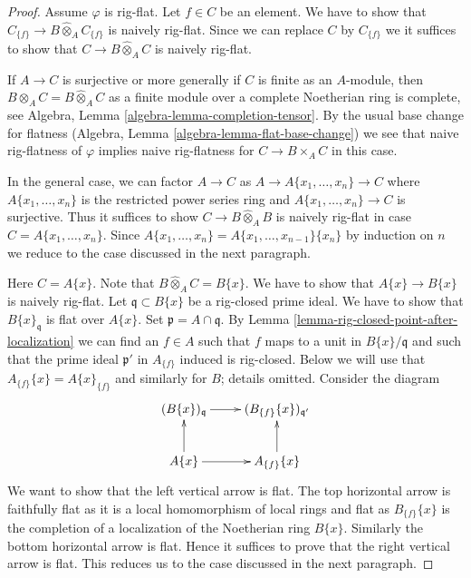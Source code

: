 \documentclass{stacks-project}
\theoremstyle{plain}
\theoremstyle{definition}
\theoremstyle{remark}
\numberwithin{equation}{subsection}
\begin{document}
\begin{proof}
Assume $\varphi$ is rig-flat. Let $f \in C$ be an element.
We have to show that
$C_{\{f\}} \to B \widehat{\otimes}_A C_{\{f\}}$
is naively rig-flat. Since we can replace $C$ by $C_{\{f\}}$
we it suffices to show that $C \to B \widehat{\otimes}_A C$
is naively rig-flat.

\medskip\noindent
If $A \to C$ is surjective or more generally if $C$ is finite as
an $A$-module, then $B \otimes_A C = B \widehat{\otimes}_A C$
as a finite module over a complete Noetherian ring is complete, see
Algebra, Lemma \ref{algebra-lemma-completion-tensor}.
By the usual base change for flatness
(Algebra, Lemma \ref{algebra-lemma-flat-base-change})
we see that naive rig-flatness of $\varphi$ implies naive rig-flatness
for $C \to B \times_A C$ in this case.

\medskip\noindent
In the general case, we can factor $A \to C$ as
$A \to A\{x_1, \ldots, x_n\} \to C$
where $A\{x_1, \ldots, x_n\}$ is the restricted power series ring
and $A\{x_1, \ldots, x_n\} \to C$ is surjective. Thus it
suffices to show $C \to B \widehat{\otimes}_A B$ is naively
rig-flat in case $C = A\{x_1, \ldots, x_n\}$.
Since $A\{x_1, \ldots, x_n\} = A\{x_1, \ldots, x_{n - 1}\}\{x_n\}$
by induction on $n$ we reduce to the case discussed in the next
paragraph.

\medskip\noindent
Here $C = A\{x\}$. Note that $B \widehat{\otimes}_A C = B\{x\}$.
We have to show that $A\{x\} \to B\{x\}$ is naively rig-flat.
Let $\mathfrak q \subset B\{x\}$ be a rig-closed prime ideal.
We have to show that $B\{x\}_{\mathfrak q}$ is flat over $A\{x\}$.
Set $\mathfrak p = A \cap \mathfrak q$.
By Lemma \ref{lemma-rig-closed-point-after-localization}
we can find an $f \in A$ such that
$f$ maps to a unit in $B\{x\}/\mathfrak q$ and such
that the prime ideal $\mathfrak p'$ in $A_{\{f\}}$ induced is rig-closed.
Below we will use that $A_{\{f\}}\{x\} = A\{x\}_{\{f\}}$ and similarly
for $B$; details omitted. Consider the diagram
$$
\xymatrix{
(B\{x\})_{\mathfrak q} \ar[r] &
(B_{\{f\}}\{x\})_{\mathfrak q'} \\
A\{x\} \ar[r] \ar[u] &
A_{\{f\}}\{x\} \ar[u]
}
$$
We want to show that the left vertical arrow is flat.
The top horizontal arrow is faithfully flat as it is a local
homomorphism of local rings and flat as $B_{\{f\}}\{x\}$
is the completion of a localization of the Noetherian ring
$B\{x\}$. Similarly the bottom horizontal arrow is flat.
Hence it suffices to prove that the right vertical arrow is flat.
This reduces us to the case discussed in the next paragraph.


\end{proof}
\end{document}
